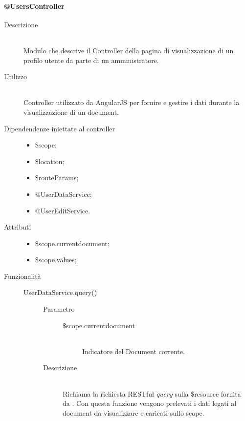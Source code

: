 \paragraph{@UsersController}
\begin{description}
 \item[Descrizione] \hfill \\
 Modulo che descrive il Controller della pagina di visualizzazione di un profilo utente da parte di un amministratore.
 
 \item[Utilizzo] \hfill \\
 Controller utilizzato da AngularJS per fornire e gestire i dati durante la visualizzazione di un document.
 
 \item[Dipendendenze iniettate al controller] \hfill
 \begin{itemize}
  \item \$scope;
  \item \$location;
  \item \$routeParams;
  \item @UserDataService;
  \item @UserEditService.
  
 \end{itemize}
 
 \item[Attributi] \hfill
 \begin{itemize}
  \item \$scope.current\textunderscore document;
  \item \$scope.values;
 \end{itemize}
 
 \item[Funzionalità] \hfill
 \begin{description}
  \item[UserDataService.query()] \hfill
  \begin{description}
  	\item[Parametro] \hfill
  		\begin{description}
  			\item[\$scope.current\textunderscore document] \hfill \\
  			Indicatore del Document corrente.
       \end{description}
  	\item[Descrizione] \hfill \\  
  Richiama la richiesta RESTful \textit{query} sulla \$resource fornita da .
  Con questa funzione vengono prelevati i dati legati al document da visualizzare e caricati sullo scope.
 

\end{description}
\end{description}
\end{description}
